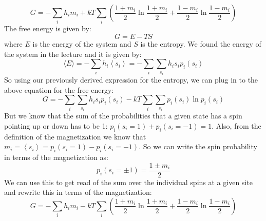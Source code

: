 \documentclass[12pt]{article}
\begin{document}
\begin{equation*}
G=-\sum_{i} h_{i} m_{i}+k T \sum_{i}\left(\frac{1+m_{i}}{2} \ln \frac{1+m_{i}}{2}+\frac{1-m_{i}}{2} \ln \frac{1-m_{i}}{2}\right) \tag{2}
\end{equation*}
The free energy is given by:
\begin{equation}
G=E-TS
\end{equation}
where $E$ is the energy of the system and $S$ is the entropy. We found the energy of the system in the lecture and it is given by:
\begin{equation}
\langle E\rangle=-\sum_i h_i\left\langle s_i\right\rangle=-\sum_i \sum_{s_i} h_i s_i p_i\left(s_i\right)
\end{equation}
So using our previously derived expression for the entropy, we can plug in to the above equation for the free energy:
\begin{equation}
G=-\sum_i \sum_{s_i} h_i s_i p_i\left(s_i\right)-kT\sum_i \sum_{s_i} p_i\left(s_i\right) \ln p_i\left(s_i\right)
\end{equation}
But we know that the sum of the probabilities that a given state has a spin pointing up or down has to be 1: $p_i\left(s_i=1\right)+p_i\left(s_i=-1\right)=1$. Also, from the definition of the magnetization we know that $m_i=\left\langle s_i\right\rangle=p_i\left(s_i=1\right)-p_i\left(s_i=-1\right)$. So we can write the spin probability in terms of the magnetization as:
\begin{equation}
p_i\left(s_i=\pm1\right)=\frac{1\pm m_i}{2}
\end{equation}
We can use this to get read of the sum over the individual spins at a given site and rewrite this in terms of the magnetization:
\begin{equation}
G=-\sum_i h_i m_i-kT\sum_i \left(\frac{1+m_i}{2} \ln \frac{1+m_i}{2}+\frac{1-m_i}{2} \ln \frac{1-m_i}{2}\right)
\end{equation}
\subsection{}
\end{document}

